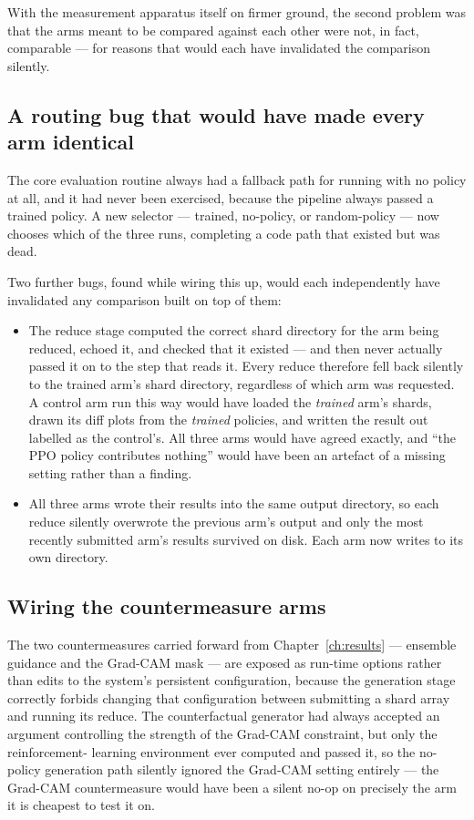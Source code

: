 With the measurement apparatus itself on firmer ground, the second problem
was that the arms meant to be compared against each other were not, in
fact, comparable --- for reasons that would each have invalidated the
comparison silently.

\subsection{A routing bug that would have made every arm identical}

The core evaluation routine always had a fallback path for running with
no policy at all, and it had never been exercised, because the pipeline
always passed a trained policy. A new selector --- trained, no-policy, or
random-policy --- now chooses which of the three runs, completing a code
path that existed but was dead.

Two further bugs, found while wiring this up, would each independently have
invalidated any comparison built on top of them:

\begin{itemize}[leftmargin=*]
  \item The reduce stage computed the correct shard directory for the
        arm being reduced, echoed it, and checked that it existed ---
        and then never actually passed it on to the step that reads it.
        Every reduce therefore fell back silently to the trained arm's
        shard directory, regardless of which arm was requested. A control
        arm run this way would have loaded the \emph{trained} arm's
        shards, drawn its diff plots from the \emph{trained} policies,
        and written the result out labelled as the control's. All three
        arms would have agreed exactly, and ``the PPO policy contributes
        nothing'' would have been an artefact of a missing setting rather
        than a finding.
  \item All three arms wrote their results into the same output
        directory, so each reduce silently overwrote the previous arm's
        output and only the most recently submitted arm's results
        survived on disk. Each arm now writes to its own directory.
\end{itemize}

\subsection{Wiring the countermeasure arms}

The two countermeasures carried forward from Chapter~\ref{ch:results} ---
ensemble guidance and the Grad-CAM mask --- are exposed as run-time
options rather than edits to the system's persistent configuration,
because the generation stage correctly forbids changing that
configuration between submitting a shard array and running its reduce.
The counterfactual generator had always accepted an argument controlling
the strength of the Grad-CAM constraint, but only the reinforcement-
learning environment ever computed and passed it, so the no-policy
generation path silently ignored the Grad-CAM setting entirely --- the
Grad-CAM countermeasure would have been a silent no-op on precisely the
arm it is cheapest to test it on.

